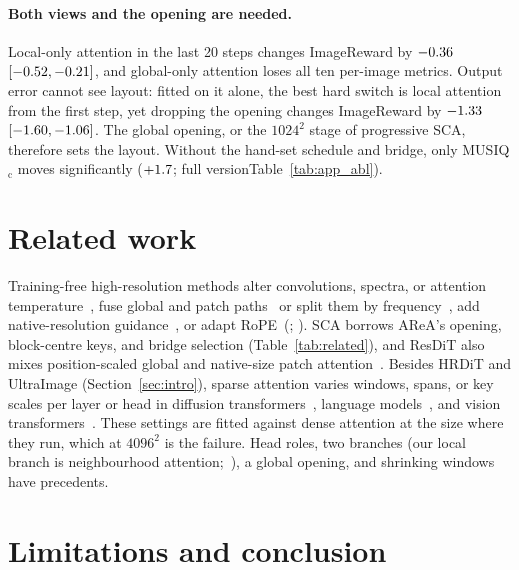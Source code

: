 \documentclass{article} %
\newcommand{\fullonly}[1]{\ifshortversion\else#1\fi}
\newcommand{\shortalt}[2]{\ifshortversion#2\else#1\fi}
\newcommand{\sca}{SCA}
\theoremstyle{remark}
\begin{document}
\paragraph{Both views and the opening are needed.} Local-only attention in the last 20 steps changes ImageReward by $-0.36$ $[-0.52,-0.21]$, and global-only attention loses all ten per-image metrics. Output error cannot see layout: fitted on it alone, the best hard switch is local attention from the first step, yet dropping the opening changes ImageReward by $-1.33$ $[-1.60,-1.06]$. The global opening, or the $1024^2$ stage of progressive \sca{}, therefore sets the layout. Without the hand-set schedule and bridge, only MUSIQ$_\text{c}$ moves significantly ($+1.7$; \shortalt{Table~\ref{tab:app_abl}}{full version}).

\section{Related work}
\label{sec:related}
Training-free high-resolution methods alter convolutions, spectra, or attention temperature~\citep{he2023scalecrafter,zhang2023hidiffusion,huang2024fouriscale,jin2023training}, fuse global and patch paths~\citep{du2023demofusion,yang2024fam} or split them by frequency~\citep{qiu2024freescale}, add native-resolution guidance~\citep{du2024imax,bu2025hiflow,koh2025scalediff}, or adapt RoPE~(\citealp{zhuo2024lumina,issachar2025dype,zhao2026sigma,rajabi2026sega}; \mbox{\citealp{liu2026tide}}). \sca{} borrows AReA's opening, block-centre keys, and bridge selection\fullonly{ (Table~\ref{tab:related})}, and ResDiT also mixes position-scaled global and native-size patch attention~\citep{ma2025resdit}. Besides HRDiT and UltraImage (Section~\ref{sec:intro}), sparse attention varies windows, spans, or key scales per layer or head in diffusion transformers~\citep{yuan2024ditfastattn,xi2025svg,zhang2025sta}, language models~\citep{fu2024moa,xiao2024duoattention}, and vision transformers~\citep{pan2022hilo}. These settings are fitted against dense attention at the size where they run, which at $4096^2$ is the failure. Head roles, two branches (our local branch is neighbourhood attention;~\citealp{hassani2022nat}), a global opening, and shrinking windows have precedents.

\section{Limitations and conclusion}
\label{sec:limits}
\end{document}

